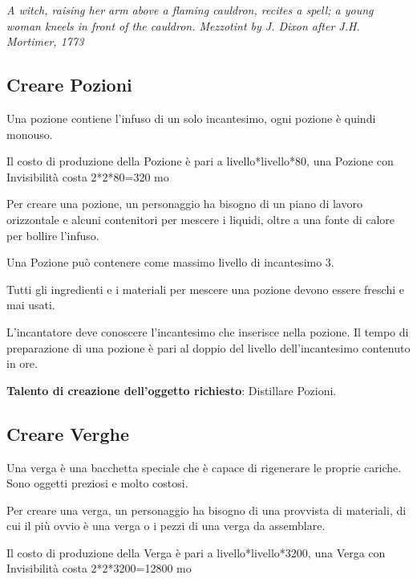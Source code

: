 \begin{multicols}{2}
\begin{center}
		\textit{A witch, raising her arm above a flaming cauldron, recites a spell; a young woman kneels in front of the cauldron. Mezzotint by J. Dixon after J.H. Mortimer, 1773}
	\end{center}

	\subsection{Creare Pozioni}

	Una pozione contiene l'infuso di un solo incantesimo, ogni pozione è quindi monouso.

	\medskip

	Il costo di produzione della Pozione è pari a livello*livello*80, una Pozione con Invisibilità costa 2*2*80=320 mo

	\bigskip

	Per creare una pozione, un personaggio ha bisogno di un piano di lavoro orizzontale e alcuni contenitori per mescere i liquidi, oltre a una fonte di calore per bollire l'infuso.

	Una Pozione può contenere come massimo livello di incantesimo 3.

	Tutti gli ingredienti e i materiali per mescere una pozione devono essere freschi e mai usati.

	L'incantatore deve conoscere l'incantesimo che inserisce nella pozione. Il tempo di preparazione di una pozione è pari al doppio del livello dell'incantesimo contenuto in ore.

	\medskip

	\textbf{Talento di creazione dell'oggetto richiesto}: Distillare Pozioni.

	\subsection{Creare Verghe}

	Una verga è una bacchetta speciale che è capace di rigenerare le proprie cariche. Sono oggetti preziosi e molto costosi.

	Per creare una verga, un personaggio ha bisogno di una provvista di materiali, di cui il più ovvio è una verga o i pezzi di una verga da assemblare.

	\medskip

	Il costo di produzione della Verga è pari a livello*livello*3200, una Verga con Invisibilità costa 2*2*3200=12800 mo

	\bigskip


\end{multicols}

